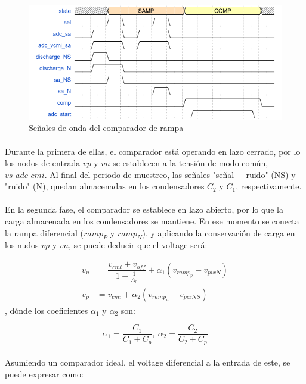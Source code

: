 \begin{figure}[h]
	\includegraphics[width=\textwidth]{img/adc_wave.png}
	\caption{Señales de onda del comparador de rampa}
	\label{fig:adc_wave}
\end{figure}

\paragraph{}
Durante la primera de ellas, el comparador está operando en lazo cerrado, por lo
los nodos de entrada $vp$ y $vn$ se establecen a la tensión de modo
común, $vs\_adc\_cmi$. Al final del periodo de muestreo, las señales
"señal + ruido" (NS) y "ruido" (N), quedan almacenadas en los condensadores $C_2$
y $C_1$, respectivamente.

\paragraph{}
En la segunda fase, el comparador se establece en lazo abierto, por lo que la carga
almacenada en los condensadores se mantiene. En ese momento se conecta la
rampa diferencial ($ramp_P$ y $ramp_N$), y aplicando la conservación de carga en los
nudos $vp$ y $vn$, se puede deducir que el voltage será:

\begin{align}
	v_n &= \dfrac{v_{cmi} + v_{off}}{1+\frac{1}{A_0}} + \alpha_1 (v_{ramp_p}-v_{pixN})\\
	v_p &= v_{cmi} + \alpha_2 (v_{ramp_n}-v_{pixNS})
\end{align}
, dónde los coeficientes $\alpha_1$ y $\alpha_2$ son:

\begin{equation}
	\alpha_1 = \dfrac{C_1}{C_1+C_p},~
	\alpha_2 = \dfrac{C_2}{C_2+C_p}
\end{equation}

\paragraph{}
Asumiendo un comparador ideal, el voltage diferencial a la entrada de este, se
puede expresar como:

